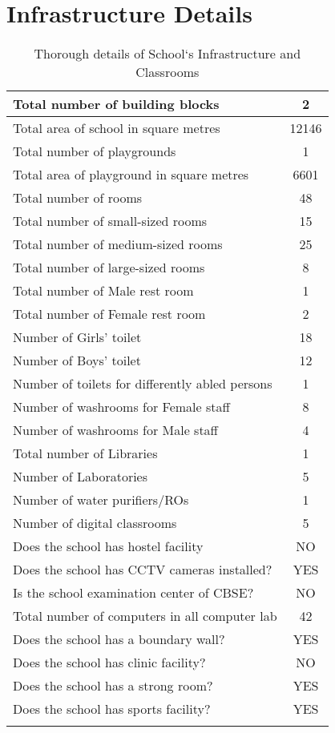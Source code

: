 \section{Infrastructure Details}
\begin{longtable}{|l|c|} \hline 
Total number of building blocks & 2\\ \hline 
Total area of school in square metres & 12146\\ \hline 
Total number of playgrounds & 1\\ \hline
Total area of playground in square metres & 6601\\ \hline 
Total number of rooms & 48\\ \hline 
Total number of small-sized rooms & 15\\ \hline 
Total number of medium-sized rooms & 25\\ \hline 
Total number of large-sized rooms & 8\\ \hline 
Total number of Male rest room & 1\\ \hline 
Total number of Female rest room & 2\\ \hline 
Number of Girls' toilet & 18\\ \hline 
Number of Boys' toilet & 12\\ \hline 
Number of toilets for differently abled persons & 1\\ \hline 
Number of washrooms for Female staff & 8\\ \hline 
Number of washrooms for Male staff & 4\\ \hline 
Total number of Libraries & 1\\ \hline 
Number of Laboratories & 5\\ \hline 
Number of water purifiers/ROs & 1\\ \hline 
Number of digital classrooms & 5\\ \hline 
Does the school has hostel facility & NO\\ \hline 
Does the school has CCTV cameras installed? & YES\\ \hline 
Is the school examination center of CBSE? & NO\\ \hline 
Total number of computers in all computer lab & 42\\ \hline 
Does the school has a boundary wall? & YES\\ \hline 
Does the school has clinic facility? & NO\\ \hline 
Does the school has a strong room? & YES\\ \hline 
Does the school has sports facility? & YES\\ \hline 
\caption*{Thorough details of School`s Infrastructure and Classrooms}
\end{longtable}


